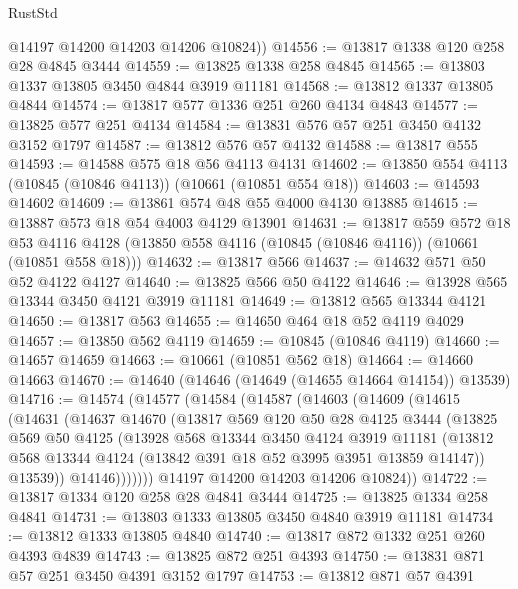 \begin{lexlean}{RustStd}
\begin{coremodule}
        @14197
        @14200
        @14203
        @14206
        @10824))
@14556 := @13817 @1338 @120 @258 @28 @4845 @3444
@14559 := @13825 @1338 @258 @4845
@14565 := @13803 @1337 @13805 @3450 @4844 @3919 @11181
@14568 := @13812 @1337 @13805 @4844
@14574 := @13817 @577 @1336 @251 @260 @4134 @4843
@14577 := @13825 @577 @251 @4134
@14584 := @13831 @576 @57 @251 @3450 @4132 @3152 @1797
@14587 := @13812 @576 @57 @4132
@14588 := @13817 @555
@14593 := @14588 @575 @18 @56 @4113 @4131
@14602 := @13850 @554 @4113 (@10845 (@10846 @4113)) (@10661 (@10851 @554 @18))
@14603 := @14593 @14602
@14609 := @13861 @574 @48 @55 @4000 @4130 @13885
@14615 := @13887 @573 @18 @54 @4003 @4129 @13901
@14631 := @13817
    @559
    @572
    @18
    @53
    @4116
    @4128
    (@13850 @558 @4116 (@10845 (@10846 @4116)) (@10661 (@10851 @558 @18)))
@14632 := @13817 @566
@14637 := @14632 @571 @50 @52 @4122 @4127
@14640 := @13825 @566 @50 @4122
@14646 := @13928 @565 @13344 @3450 @4121 @3919 @11181
@14649 := @13812 @565 @13344 @4121
@14650 := @13817 @563
@14655 := @14650 @464 @18 @52 @4119 @4029
@14657 := @13850 @562 @4119
@14659 := @10845 (@10846 @4119)
@14660 := @14657 @14659
@14663 := @10661 (@10851 @562 @18)
@14664 := @14660 @14663
@14670 := @14640 (@14646 (@14649 (@14655 @14664 @14154)) @13539)
@14716 := @14574
    (@14577
      (@14584
        (@14587
          (@14603
            (@14609
              (@14615
                (@14631
                  (@14637
                    @14670
                    (@13817
                      @569
                      @120
                      @50
                      @28
                      @4125
                      @3444
                      (@13825
                        @569
                        @50
                        @4125
                        (@13928
                          @568
                          @13344
                          @3450
                          @4124
                          @3919
                          @11181
                          (@13812 @568 @13344 @4124 (@13842 @391 @18 @52 @3995 @3951 @13859 @14147))
                          @13539))
                      @14146)))))))
        @14197
        @14200
        @14203
        @14206
        @10824))
@14722 := @13817 @1334 @120 @258 @28 @4841 @3444
@14725 := @13825 @1334 @258 @4841
@14731 := @13803 @1333 @13805 @3450 @4840 @3919 @11181
@14734 := @13812 @1333 @13805 @4840
@14740 := @13817 @872 @1332 @251 @260 @4393 @4839
@14743 := @13825 @872 @251 @4393
@14750 := @13831 @871 @57 @251 @3450 @4391 @3152 @1797
@14753 := @13812 @871 @57 @4391

\end{coremodule}
\end{lexlean}
